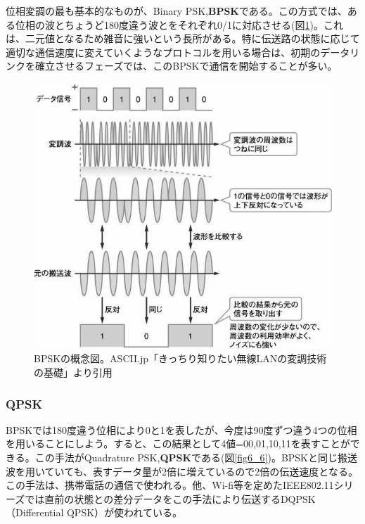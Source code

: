 位相変調の最も基本的なものが、Binary PSK,\textbf{BPSK}である。この方式では、ある位相の波とちょうど180度違う波とをそれぞれ0/1に対応させる(図\ref{fig6_5})。これは、二元値となるため雑音に強いという長所がある。特に伝送路の状態に応じて適切な通信速度に変えていくようなプロトコルを用いる場合は、初期のデータリンクを確立させるフェーズでは、このBPSKで通信を開始することが多い。

\begin{figure}[htb]
\centering
\includegraphics[width=0.8\linewidth,keepaspectratio,bb=0 0 588 524]{fig/fig6_5.jpg}
\caption{BPSKの概念図。ASCII.jp「きっちり知りたい無線LANの変調技術の基礎」より引用}\label{fig6_5}
\end{figure}

\subsubsection{QPSK}

BPSKでは180度違う位相により0と1を表したが、今度は90度ずつ違う4つの位相を用いることにしよう。すると、この結果として4値=00,01,10,11を表すことができる。この手法がQuadrature PSK,\textbf{QPSK}である(図\ref{fig6_6})。BPSKと同じ搬送波を用いていても、表すデータ量が2倍に増えているので2倍の伝送速度となる。この手法は、携帯電話の通信で使われる。他、Wi-fi等を定めたIEEE802.11シリーズでは直前の状態との差分データをこの手法により伝送するDQPSK（Differential QPSK）が使われている。

